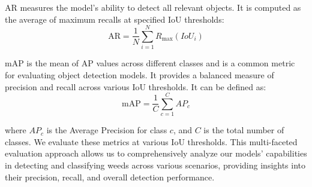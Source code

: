 AR \cite{zhu2004recall} measures the model's ability to detect all relevant objects. It is computed as the average of maximum recalls at specified IoU thresholds:
\vspace{-0.2cm}
\begin{equation}
\text{AR} = \frac{1}{N} \sum_{i=1}^N R_{\text{max}}(IoU_i)
\end{equation}

mAP is the mean of AP values across different classes and is a common metric for evaluating object detection models. It provides a balanced measure of precision and recall across various IoU thresholds. It can be defined as:
\vspace{-0.2cm}
\begin{equation}
\text{mAP} = \frac{1}{C} \sum_{c=1}^C AP_c
\end{equation}

where $AP_c$ is the Average Precision for class $c$, and $C$ is the total number of classes.
We evaluate these metrics at various IoU thresholds. This multi-faceted evaluation approach allows us to comprehensively analyze our models' capabilities in detecting and classifying weeds across various scenarios, providing insights into their precision, recall, and overall detection performance.
